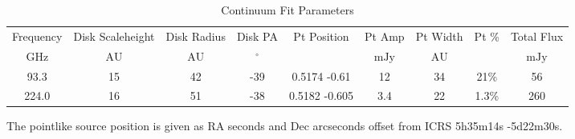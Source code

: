 \begin{table*}[htp]
\centering
\caption{Continuum Fit Parameters}
\begin{tabular}{ccccccccc}
\label{tab:continuum_fit_parameters}
Frequency & Disk Scaleheight & Disk Radius & Disk PA & Pt Position & Pt Amp & Pt Width & Pt \% & Total Flux \\
$\mathrm{GHz}$ & $\mathrm{AU}$ & $\mathrm{AU}$ & $\mathrm{{}^{\circ}}$ &  & $\mathrm{mJy}$ & $\mathrm{AU}$ & $\mathrm{}$ & $\mathrm{mJy}$ \\
\hline
93.3 & 15 & 42 & -39 & 0.5174 -0.61 & 12 & 34 & 21\% & 56 \\
224.0 & 16 & 51 & -38 & 0.5182 -0.605 & 3.4 & 22 & 1.3\% & 260 \\
\hline
\end{tabular}

\par The pointlike source position is given as RA seconds and Dec arcseconds offset from ICRS 5h35m14s -5d22m30s.
\end{table*}
